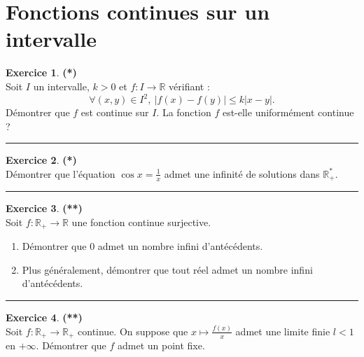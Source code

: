 \documentclass[a4paper,11pt]{article}
\theoremstyle{definition}
\newtheorem{exo}{Exercice} %
\begin{document}
\begin{minipage}[t]{1\linewidth}
	\section*{Fonctions continues sur un intervalle}

	
	\begin{minipage}[t]{0.48\linewidth}
		\raggedright
		
	
				\begin{exo}\textbf{(*)}\quad\\[0.2cm]
			Soit $I$ un intervalle, $k>0$ et $f:I\to\mathbb R$ vérifiant :
			$$\forall (x,y)\in I^2,\ |f(x)-f(y)|\leq k|x-y|.$$
			Démontrer que $f$ est continue sur $I$. La fonction $f$ est-elle uniformément continue ?
			
			\centering
			\rule{1\linewidth}{0.6pt}
		\end{exo}
	
		\begin{exo}\textbf{(*)}\quad\\[0.2cm]
			Démontrer que l'équation $\cos x=\frac 1x$ admet une infinité de solutions dans $\mathbb R_+^*$.
			
			\centering
			\rule{1\linewidth}{0.6pt}
		\end{exo}
	
			\begin{exo}\textbf{(**)}\quad\\[0.2cm]
		Soit $f:\mathbb R_+\to\mathbb R$ une fonction continue surjective. 
		\begin{enumerate}
			\item Démontrer que $0$ admet un nombre infini d'antécédents.
			\item Plus généralement, démontrer que tout réel admet un nombre infini d'antécédents.
		\end{enumerate}
		
		\centering
		\rule{1\linewidth}{0.6pt}
	\end{exo}
		
		
		
	
	

\begin{exo}\textbf{(**)}\quad\\[0.2cm]
	Soit $f:\mathbb R_+\to \mathbb R_+$ continue. On suppose que $x\mapsto \frac{f(x)}x$ admet une limite
	finie $l<1$ en $+\infty$. Démontrer que $f$ admet un point fixe.
	

\end{exo}
\end{minipage}
\end{minipage}
\end{document}

